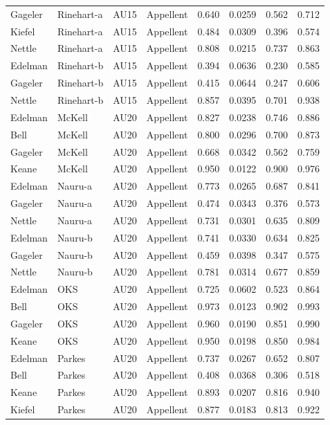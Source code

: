 \documentclass{monashthesis}
\begin{document}
\begin{center}
\begin{longtable}{llllllll}
Gageler & Rinehart-a & AU15 & Appellent & 0.640 & 0.0259 & 0.562 & 0.712 \\
Kiefel & Rinehart-a & AU15 & Appellent & 0.484 & 0.0309 & 0.396 & 0.574 \\
Nettle & Rinehart-a & AU15 & Appellent & 0.808 & 0.0215 & 0.737 & 0.863 \\
Edelman & Rinehart-b & AU15 & Appellent & 0.394 & 0.0636 & 0.230 & 0.585 \\
Gageler & Rinehart-b & AU15 & Appellent & 0.415 & 0.0644 & 0.247 & 0.606 \\
Nettle & Rinehart-b & AU15 & Appellent & 0.857 & 0.0395 & 0.701 & 0.938 \\
Edelman & McKell & AU20 & Appellent & 0.827 & 0.0238 & 0.746 & 0.886 \\
Bell & McKell & AU20 & Appellent & 0.800 & 0.0296 & 0.700 & 0.873 \\
Gageler & McKell & AU20 & Appellent & 0.668 & 0.0342 & 0.562 & 0.759 \\
Keane & McKell & AU20 & Appellent & 0.950 & 0.0122 & 0.900 & 0.976 \\
Edelman & Nauru-a & AU20 & Appellent & 0.773 & 0.0265 & 0.687 & 0.841 \\
Gageler & Nauru-a & AU20 & Appellent & 0.474 & 0.0343 & 0.376 & 0.573 \\
Nettle & Nauru-a & AU20 & Appellent & 0.731 & 0.0301 & 0.635 & 0.809 \\
Edelman & Nauru-b & AU20 & Appellent & 0.741 & 0.0330 & 0.634 & 0.825 \\
Gageler & Nauru-b & AU20 & Appellent & 0.459 & 0.0398 & 0.347 & 0.575 \\
Nettle & Nauru-b & AU20 & Appellent & 0.781 & 0.0314 & 0.677 & 0.859 \\
Edelman & OKS & AU20 & Appellent & 0.725 & 0.0602 & 0.523 & 0.864 \\
Bell & OKS & AU20 & Appellent & 0.973 & 0.0123 & 0.902 & 0.993 \\
Gageler & OKS & AU20 & Appellent & 0.960 & 0.0190 & 0.851 & 0.990 \\
Keane & OKS & AU20 & Appellent & 0.950 & 0.0198 & 0.850 & 0.984 \\
Edelman & Parkes & AU20 & Appellent & 0.737 & 0.0267 & 0.652 & 0.807 \\
Bell & Parkes & AU20 & Appellent & 0.408 & 0.0368 & 0.306 & 0.518 \\
Keane & Parkes & AU20 & Appellent & 0.893 & 0.0207 & 0.816 & 0.940 \\
Kiefel & Parkes & AU20 & Appellent & 0.877 & 0.0183 & 0.813 & 0.922 \\

\end{longtable}
\end{center}
\end{document}
